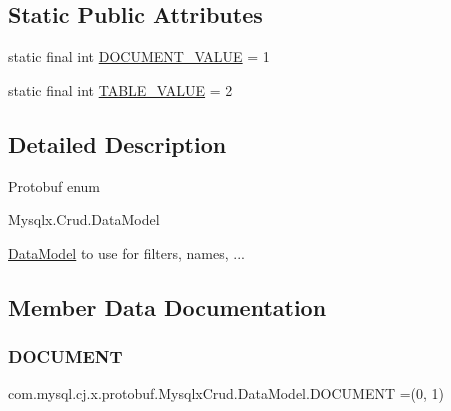 \subsection*{Static Public Attributes}
\begin{DoxyCompactItemize}
\item 
static final int \mbox{\hyperlink{enumcom_1_1mysql_1_1cj_1_1x_1_1protobuf_1_1_mysqlx_crud_1_1_data_model_a331cafa358eb0c55a7b3a46b3032e568}{D\+O\+C\+U\+M\+E\+N\+T\+\_\+\+V\+A\+L\+UE}} = 1
\item 
static final int \mbox{\hyperlink{enumcom_1_1mysql_1_1cj_1_1x_1_1protobuf_1_1_mysqlx_crud_1_1_data_model_ae5fdd8346e00f9cd984eae15087e82c6}{T\+A\+B\+L\+E\+\_\+\+V\+A\+L\+UE}} = 2
\end{DoxyCompactItemize}


\subsection{Detailed Description}
Protobuf enum
\begin{DoxyCode}
Mysqlx.Crud.DataModel 
\end{DoxyCode}



\begin{DoxyPre}
\mbox{\hyperlink{enumcom_1_1mysql_1_1cj_1_1x_1_1protobuf_1_1_mysqlx_crud_1_1_data_model}{DataModel}} to use for filters, names, ...
\end{DoxyPre}
 

\subsection{Member Data Documentation}
\mbox{\label{enumcom_1_1mysql_1_1cj_1_1x_1_1protobuf_1_1_mysqlx_crud_1_1_data_model_ae7a3238c10f1593f2b0f364281316b37}} 
\subsubsection{\texorpdfstring{D\+O\+C\+U\+M\+E\+NT}{DOCUMENT}}
{\footnotesize\ttfamily com.\+mysql.\+cj.\+x.\+protobuf.\+Mysqlx\+Crud.\+Data\+Model.\+D\+O\+C\+U\+M\+E\+NT =(0, 1)}

